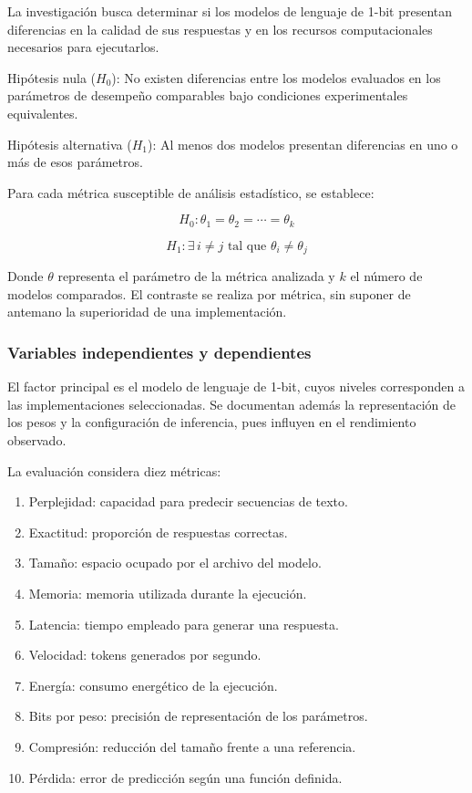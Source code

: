 La investigación busca determinar si los modelos de lenguaje de 1-bit presentan diferencias en la calidad de sus respuestas y en los recursos computacionales necesarios para ejecutarlos.

Hipótesis nula ($H_0$): No existen diferencias entre los modelos evaluados en los parámetros de desempeño comparables bajo condiciones experimentales equivalentes.

Hipótesis alternativa ($H_1$): Al menos dos modelos presentan diferencias en uno o más de esos parámetros.

Para cada métrica susceptible de análisis estadístico, se establece:

\[
H_0:\theta_1=\theta_2=\cdots=\theta_k
\]

\[
H_1:\exists\,i\neq j\text{ tal que }\theta_i\neq\theta_j
\]

Donde $\theta$ representa el parámetro de la métrica analizada y $k$ el número de modelos comparados. El contraste se realiza por métrica, sin suponer de antemano la superioridad de una implementación.

\subsubsection{Variables independientes y dependientes}

El factor principal es el modelo de lenguaje de 1-bit, cuyos niveles corresponden a las implementaciones seleccionadas. Se documentan además la representación de los pesos y la configuración de inferencia, pues influyen en el rendimiento observado.

La evaluación considera diez métricas:

\begin{enumerate}[nosep,leftmargin=*,itemsep=1pt]
\item Perplejidad: capacidad para predecir secuencias de texto.
\item Exactitud: proporción de respuestas correctas.
\item Tamaño: espacio ocupado por el archivo del modelo.
\item Memoria: memoria utilizada durante la ejecución.
\item Latencia: tiempo empleado para generar una respuesta.
\item Velocidad: tokens generados por segundo.
\item Energía: consumo energético de la ejecución.
\item Bits por peso: precisión de representación de los parámetros.
\item Compresión: reducción del tamaño frente a una referencia.
\item Pérdida: error de predicción según una función definida.
\end{enumerate}


